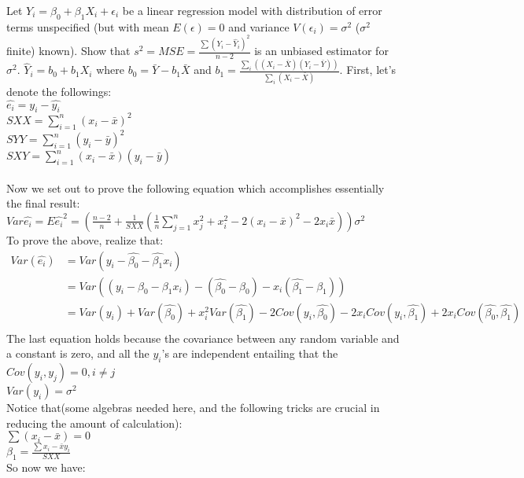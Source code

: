 \documentclass[12pt]{article}
\begin{document}
 { Let $Y_i = \beta_0 + \beta_1 X_i + \epsilon_i$ be a
linear regression model with distribution of error terms unspecified
(but with mean $E(\epsilon) = 0$ and variance $V(\epsilon_i) =
\sigma^2$ ($\sigma^2$ finite) known).  Show that $s^2 = MSE =
\frac{\sum(Y_i-\hat Y_i)^2}{n-2}$ is an unbiased estimator for
$\sigma^2$.  $\hat Y_i = b_0 + b_1 X_i$ where $b_0 = \bar Y - b_1
\bar X$ and $b_1 = \frac{\sum_i((X_i-\bar X)(Y_i - \bar
Y))}{\sum_i(X_i-\bar X)}$. } { \vfill
  \answer
}
{
First, let's denote the followings:\\
$\hat{e_i}=y_i-\hat{y_i}$\\
$SXX=\displaystyle\sum_{i=1}^n (x_i-\bar{x})^2$\\
$SYY=\displaystyle\sum_{i=1}^n (y_i-\bar{y})^2$\\
$SXY=\displaystyle\sum_{i=1}^n (x_i-\bar{x})(y_i-\bar{y})$\\
\\
Now we set out to prove the following equation which accomplishes
essentially the final result:\\
$Var\hat{e_i}=E\hat{e_i}^2=(\frac{n-2}{n}+\frac{1}{SXX}(\frac{1}{n}\displaystyle\sum_{j=1}^nx_j^2+x_i^2-2(x_i-\bar{x})^2-2x_i\bar{x}))\sigma^2$\\
To prove the above, realize that:\\
\begin{align*}
Var(\hat{e_i})&=Var(y_i-\hat{\beta_0}-\hat{\beta_1}x_i)\\
              &=Var((y_i-\beta_0-\beta_1x_i)-(\hat{\beta_0}-\beta_0)-x_i(\hat{\beta_1}-\beta_1))\\
              &=Var(y_i)+Var(\hat{\beta_0})+x_i^2Var(\hat{\beta_1})-2Cov(y_i,\hat{\beta_0})-2x_iCov(y_i,\hat{\beta_1})+2x_iCov(\hat{\beta_0},\hat{\beta_1})\\
\end{align*}
The last equation holds because the covariance between any random
variable and a constant is zero, and all the $y_i$'s are independent
entailing that the $Cov(y_i,y_j)=0,i\not=j$\\
$Var(y_i)=\sigma^2$\\
Notice that(some algebras needed here, and the following tricks are
crucial in reducing the amount of calculation):\\
$\sum{(x_i-\bar{x})}=0$\\
$\beta_1=\frac{\sum{x_i-\bar{x}}y_i}{SXX}$\\
So now we have:\\
\begin{align*}

\end{align*}}
\end{document}
